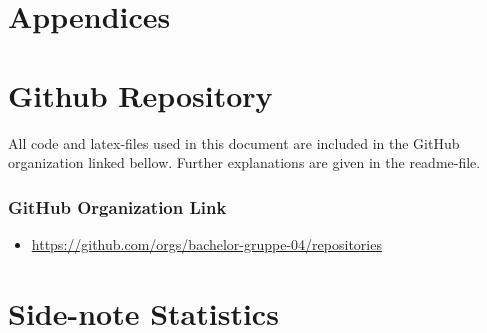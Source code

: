 \chapter*{\LARGE Appendices}

\appendix

\chapter{Github Repository}

All code and latex-files used in this document are included in the GitHub organization linked bellow. Further explanations are given in the readme-file.

\subsection*{GitHub Organization Link}

\begin{itemize}
    \item \url{https://github.com/orgs/bachelor-gruppe-04/repositories}
\end{itemize}

\chapter{Side-note Statistics}

